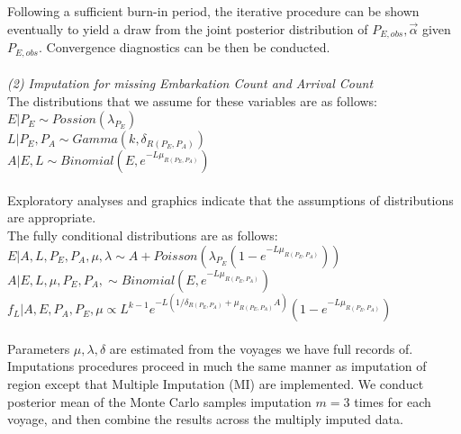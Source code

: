 \documentclass{article}
\begin{document}
Following a sufficient burn-in period, the iterative procedure can be shown eventually to yield a draw from the joint posterior distribution of $P_{E, obs},\vec{\alpha}$ given $P_{E, obs}$. Convergence diagnostics can be then be conducted.\\
\\
\textit{(2) Imputation for missing Embarkation Count and Arrival Count}\\
\indent
The distributions that we assume for these variables are as follows:\\
\indent
$E|P_E \sim Possion(\lambda_{P_E})$\\
\indent
$L|P_E, P_A \sim Gamma(k, \delta_{R(P_E, P_A)})$\\
\indent
$A|E, L \sim Binomial(E, e^{-L\mu_{R(P_E, P_A)}})$\\
\\
\indent
Exploratory analyses and graphics indicate that the assumptions of distributions are appropriate.\\

The fully conditional distributions are as follows:\\
\indent
$E|A, L, P_E, P_A, \mu, \lambda \sim A+Poisson(\lambda_{P_E}(1-e^{-L\mu_{R(P_E, P_A)}}))$\\
\indent
$A|E, L,  \mu, P_E, P_A, \sim Binomial(E,e^{-L\mu_{R(P_E, P_A)}} )$\\
\indent
$f_L|A, E, P_A, P_E, \mu \propto  L^{k-1} e^{-L(1/\delta_{R(P_E, P_A)}+\mu_{R(P_E, P_A)}A)}(1-e^{-L\mu_{R(P_E, P_A)}})$\\
\\
\indent
Parameters $\mu, \lambda, \delta$ are estimated from the voyages we have full records of. Imputations procedures proceed in much the same manner as imputation of region except that Multiple Imputation (MI) are implemented. We conduct posterior mean of the Monte Carlo samples imputation $m=3$ times for each voyage, and then combine the results across the multiply imputed data.\\
\end{document}
